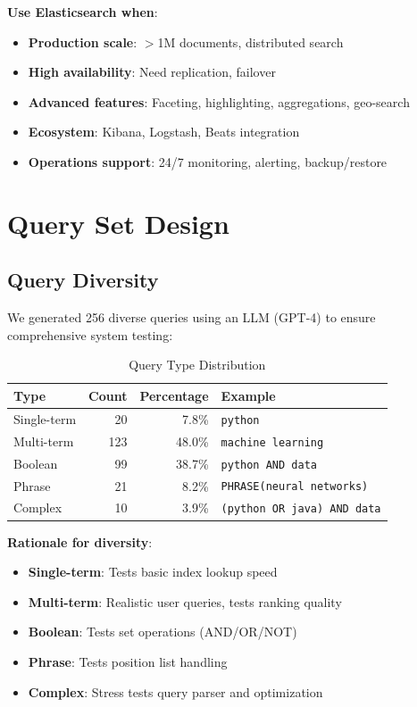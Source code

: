 \documentclass[12pt,a4paper]{article}
\begin{document}
\begin{enumerate}
    \textbf{Use Elasticsearch when}:
    \begin{itemize}
        \item \textbf{Production scale}: $>$1M documents, distributed search
        \item \textbf{High availability}: Need replication, failover
        \item \textbf{Advanced features}: Faceting, highlighting, aggregations, geo-search
        \item \textbf{Ecosystem}: Kibana, Logstash, Beats integration
        \item \textbf{Operations support}: 24/7 monitoring, alerting, backup/restore
    \end{itemize}
\end{enumerate}

\section{Query Set Design}

\subsection{Query Diversity}

We generated 256 diverse queries using an LLM (GPT-4) to ensure comprehensive system testing:

\begin{table}[H]
\centering
\begin{tabular}{lrrl}
\toprule
\textbf{Type} & \textbf{Count} & \textbf{Percentage} & \textbf{Example} \\
\midrule
Single-term & 20 & 7.8\% & \texttt{python} \\
Multi-term & 123 & 48.0\% & \texttt{machine learning} \\
Boolean & 99 & 38.7\% & \texttt{python AND data} \\
Phrase & 21 & 8.2\% & \texttt{PHRASE(neural networks)} \\
Complex & 10 & 3.9\% & \texttt{(python OR java) AND data} \\
\bottomrule
\end{tabular}
\caption{Query Type Distribution}
\end{table}

\textbf{Rationale for diversity}:
\begin{itemize}
    \item \textbf{Single-term}: Tests basic index lookup speed
    \item \textbf{Multi-term}: Realistic user queries, tests ranking quality
    \item \textbf{Boolean}: Tests set operations (AND/OR/NOT)
    \item \textbf{Phrase}: Tests position list handling
    \item \textbf{Complex}: Stress tests query parser and optimization
\end{itemize}
\end{document}

